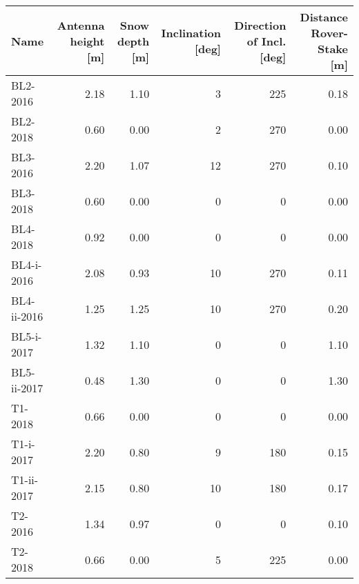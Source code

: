 \begin{tabular}{lrrrrr}
\toprule
        Name &  Antenna height [m] &  Snow depth [m] &  Inclination [deg] &  Direction of Incl. [deg] &  Distance Rover-Stake [m] \\
\midrule
    BL2-2016 &                2.18 &            1.10 &                  3 &                       225 &                      0.18 \\
    BL2-2018 &                0.60 &            0.00 &                  2 &                       270 &                      0.00 \\
    BL3-2016 &                2.20 &            1.07 &                 12 &                       270 &                      0.10 \\
    BL3-2018 &                0.60 &            0.00 &                  0 &                         0 &                      0.00 \\
    BL4-2018 &                0.92 &            0.00 &                  0 &                         0 &                      0.00 \\
  BL4-i-2016 &                2.08 &            0.93 &                 10 &                       270 &                      0.11 \\
 BL4-ii-2016 &                1.25 &            1.25 &                 10 &                       270 &                      0.20 \\
  BL5-i-2017 &                1.32 &            1.10 &                  0 &                         0 &                      1.10 \\
 BL5-ii-2017 &                0.48 &            1.30 &                  0 &                         0 &                      1.30 \\
     T1-2018 &                0.66 &            0.00 &                  0 &                         0 &                      0.00 \\
   T1-i-2017 &                2.20 &            0.80 &                  9 &                       180 &                      0.15 \\
  T1-ii-2017 &                2.15 &            0.80 &                 10 &                       180 &                      0.17 \\
     T2-2016 &                1.34 &            0.97 &                  0 &                         0 &                      0.10 \\
     T2-2018 &                0.66 &            0.00 &                  5 &                       225 &                      0.00 \\

\end{tabular}
